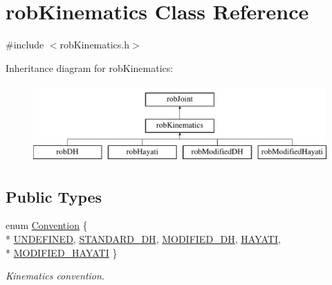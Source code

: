 \hypertarget{classrob_kinematics}{}\section{rob\+Kinematics Class Reference}
\label{classrob_kinematics}


{\ttfamily \#include $<$rob\+Kinematics.\+h$>$}

Inheritance diagram for rob\+Kinematics\+:\begin{figure}[H]
\begin{center}
\leavevmode
\includegraphics[height=3.000000cm]{db/d3c/classrob_kinematics}
\end{center}
\end{figure}
\subsection*{Public Types}
\begin{DoxyCompactItemize}
\item 
enum \hyperlink{classrob_kinematics_a298703e920da583d1f6aa60c8f65ca78}{Convention} \{ \\*
\hyperlink{classrob_kinematics_a298703e920da583d1f6aa60c8f65ca78ac39fd63d5dfdc5944393f75571e92ddc}{U\+N\+D\+E\+F\+I\+N\+E\+D}, 
\hyperlink{classrob_kinematics_a298703e920da583d1f6aa60c8f65ca78ade9e8907f05b769643a03cab1090c630}{S\+T\+A\+N\+D\+A\+R\+D\+\_\+\+D\+H}, 
\hyperlink{classrob_kinematics_a298703e920da583d1f6aa60c8f65ca78a4b835a1beb57c12542c4d946dfc33f85}{M\+O\+D\+I\+F\+I\+E\+D\+\_\+\+D\+H}, 
\hyperlink{classrob_kinematics_a298703e920da583d1f6aa60c8f65ca78a0d17a6e253b23bdcc3f7867e43e2917a}{H\+A\+Y\+A\+T\+I}, 
\\*
\hyperlink{classrob_kinematics_a298703e920da583d1f6aa60c8f65ca78a983c7e2782aebd4085826955c16e1a2e}{M\+O\+D\+I\+F\+I\+E\+D\+\_\+\+H\+A\+Y\+A\+T\+I}
 \}
\begin{DoxyCompactList}\small\item\em Kinematics convention. \end{DoxyCompactList}\end{DoxyCompactItemize}

